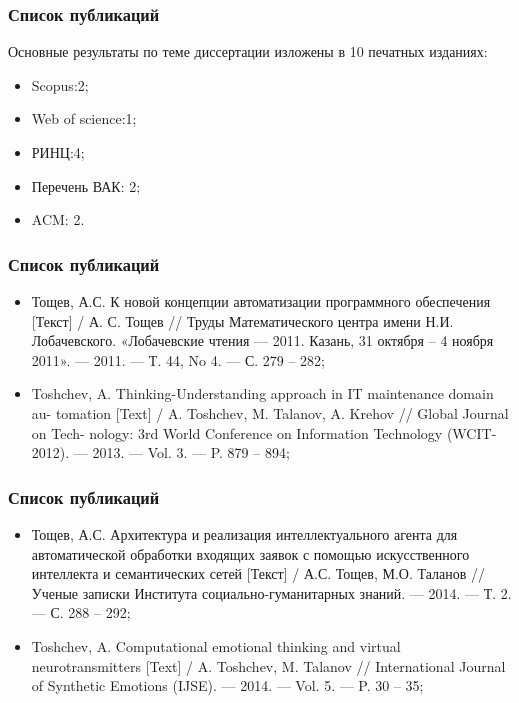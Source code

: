 \documentclass[14pt]{beamer}
\begin{document}
\begin{frame}
\frametitle{Список публикаций}
 Основные результаты по теме диссертации изложены в 10 печатных изданиях:
\begin{itemize}
	\item Scopus:2;
	\item Web of science:1;
	\item РИНЦ:4;
	\item Перечень ВАК: 2;
	\item ACM: 2.
\end{itemize}
\end{frame}

\begin{frame}
\frametitle{Список публикаций}

\begin{itemize}
	\item Тощев, А.С. К новой концепции автоматизации программного обеспечения [Текст] / А. С. Тощев // Труды Математического центра имени Н.И. Лобачевского. «Лобачевские чтения — 2011. Казань, 31 октября – 4 ноября 2011». –– 2011. –– Т. 44, No 4. –– С. 279 – 282; 
	\item Toshchev, A. Thinking-Understanding approach in IT maintenance domain au- tomation [Text] / A. Toshchev, M. Talanov, A. Krehov // Global Journal on Tech- nology: 3rd World Conference on Information Technology (WCIT-2012). — 2013. — Vol. 3. — P. 879 – 894;
	
\end{itemize}
\end{frame}

\begin{frame}
\frametitle{Список публикаций}

\begin{itemize}
	\item Тощев, А.С. Архитектура и реализация интеллектуального агента для автоматической обработки входящих заявок с помощью искусственного интеллекта и семантических сетей [Текст] / А.С. Тощев, М.О. Таланов // Ученые записки Института социально-гуманитарных знаний. –– 2014. –– Т. 2. –– С. 288 – 292; 
	\item Toshchev, A. Computational emotional thinking and virtual neurotransmitters [Text] / A. Toshchev, M. Talanov // International Journal of Synthetic Emotions (IJSE). — 2014. — Vol. 5. — P. 30 – 35;
	
\end{itemize}
\end{frame}
\end{document}
